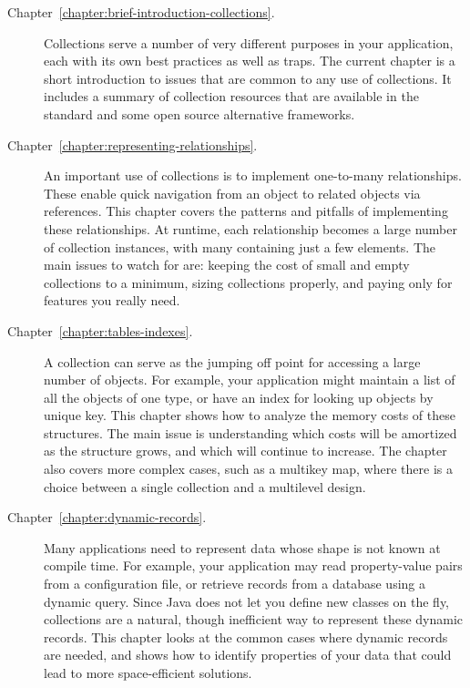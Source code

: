 \begin{description}
\item[Chapter~\ref{chapter:brief-introduction-collections}. ]
Collections serve a number of very
different purposes in your application, each with its own best practices as well
as traps. The current chapter
is a short introduction to issues that are common to
any use of collections. It includes a summary of collection resources
that are available in the standard and some open source alternative
frameworks.
\item[Chapter~\ref{chapter:representing-relationships}. ]
An important use of collections is
to implement one-to-many relationships. These enable quick navigation from an object to related objects via references. This chapter covers the patterns and pitfalls of
implementing these relationships. At runtime, each relationship
becomes a large number of collection instances, with many containing just a few elements.
The main issues to watch for
are: keeping the cost of small and empty collections to a minimum, sizing
collections properly, and paying only for features you really need.

\item[Chapter~\ref{chapter:tables-indexes}. ]
A collection can serve as the jumping off point for accessing a large number of
objects. For example, your application might maintain a list of all the objects of one type, or have an index for
looking up objects by unique key. This chapter shows how to analyze the memory
costs of these structures. The main
issue is understanding which costs will be amortized as the structure grows, and
which will continue to increase. The chapter also covers more complex cases,
such as a multikey map, where there is a choice between a single collection and a multilevel design.

\item[Chapter~\ref{chapter:dynamic-records}. ]
Many applications need to represent data whose shape is not known at compile
time. For example, your application may read property-value pairs from a configuration file,
or retrieve records from a database
using a dynamic query. Since Java does not let you define new classes on the
fly, collections are a natural, though inefficient way to represent
these dynamic records. This chapter looks at the common cases where dynamic records
are needed, and shows how to identify properties of your data that could lead to
more space-efficient solutions.


\end{description}
